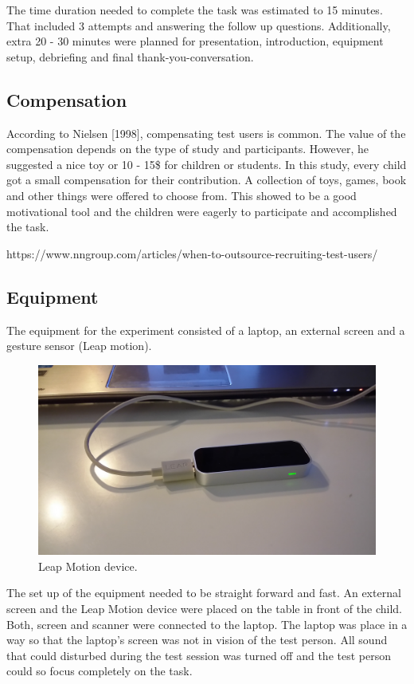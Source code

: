 The time duration needed to complete the task was estimated to 15 minutes. That included 3 attempts and answering the follow up questions. Additionally, extra 20 - 30 minutes were planned for presentation, introduction, equipment setup, debriefing and final thank-you-conversation.

\subsection{Compensation}

According to Nielsen [1998], compensating test users is common. The value of the compensation depends on the type of study and participants. However, he suggested a nice toy or 10 - 15\$ for children or students.
In this study, every child got a small compensation for their contribution. A collection of toys, games, book and other things were offered to choose from. This showed to be a good motivational tool and the children were eagerly to participate and accomplished the task.  

https://www.nngroup.com/articles/when-to-outsource-recruiting-test-users/



\subsection{Equipment}

The equipment for the experiment consisted of a laptop, an external screen and a gesture sensor (Leap motion). 

\begin{figure}[h]  %
  \centering
  \includegraphics[width=.5\textwidth]{figures/LMdevice.jpg}
  \caption[Leap Motion device.]{Leap Motion device.}
  \label{fig:setup}
\end{figure}

The set up of the equipment needed to be straight forward and fast. An external screen and the Leap Motion device were placed on the table in front of the child. Both, screen and scanner were connected to the laptop. The laptop was place in a way so that the laptop’s screen was not in vision of the test person. All sound that could disturbed during the test session was turned off and the test person could so focus completely on the task.

